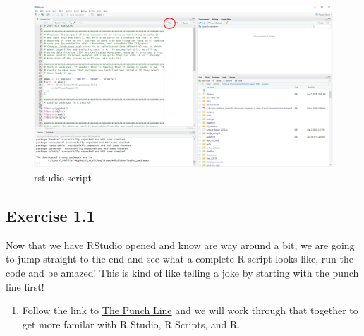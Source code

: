 \documentclass[]{article}
\providecommand{\tightlist}{%
  \setlength{\itemsep}{0pt}\setlength{\parskip}{0pt}}
\begin{document}
\begin{figure}
\centering
\includegraphics{figures/rstudio_run.jpg}
\caption{rstudio-script}
\end{figure}

\hypertarget{exercise-1.1}{%
\subsection{Exercise 1.1}\label{exercise-1.1}}

Now that we have RStudio opened and know are way around a bit, we are
going to jump straight to the end and see what a complete R script looks
like, run the code and be amazed! This is kind of like telling a joke by
starting with the punch line first!

\begin{enumerate}
\def\labelenumi{\arabic{enumi}.}
\tightlist
\item
  Follow the link to \href{punchline.md}{The Punch Line} and we will
  work through that together to get more familar with R Studio, R
  Scripts, and R.
\end{enumerate}
\end{document}
